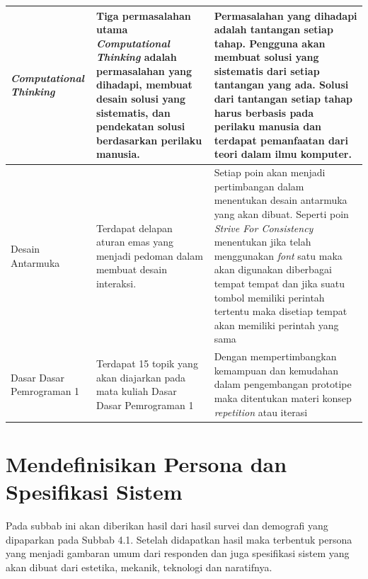 \begin{longtable}{| p{2cm} | p{5cm} | p{5cm} |}
		\hline
		\textit{Computational Thinking} & Tiga permasalahan utama \textit{Computational Thinking} adalah permasalahan yang dihadapi, membuat desain solusi yang sistematis, dan pendekatan solusi berdasarkan perilaku manusia. & Permasalahan yang dihadapi adalah tantangan setiap tahap. Pengguna akan membuat solusi yang sistematis dari setiap tantangan yang ada. Solusi dari tantangan setiap tahap harus berbasis pada perilaku manusia dan terdapat pemanfaatan dari teori dalam ilmu komputer. \\ 
		\hline
		Desain Antarmuka & Terdapat delapan aturan emas yang menjadi pedoman dalam membuat desain interaksi. & Setiap poin akan menjadi pertimbangan dalam menentukan desain antarmuka yang akan dibuat. Seperti poin \textit{Strive For Consistency} menentukan jika telah menggunakan \textit{font} satu maka akan digunakan diberbagai tempat tempat dan jika suatu tombol memiliki perintah tertentu maka disetiap tempat akan memiliki perintah yang sama \\ 
		\hline
		Dasar Dasar Pemrograman 1 & Terdapat 15 topik yang akan diajarkan pada mata kuliah Dasar Dasar Pemrograman 1 & Dengan mempertimbangkan kemampuan dan kemudahan dalam pengembangan prototipe maka ditentukan materi konsep \textit{repetition} atau iterasi \\ \hline
\end{longtable}

\section{Mendefinisikan Persona dan Spesifikasi Sistem}
Pada subbab ini akan diberikan hasil dari hasil survei dan demografi yang dipaparkan pada Subbab 4.1. Setelah didapatkan hasil maka terbentuk persona yang menjadi gambaran umum dari responden dan juga spesifikasi sistem yang akan dibuat dari estetika, mekanik, teknologi dan naratifnya.

